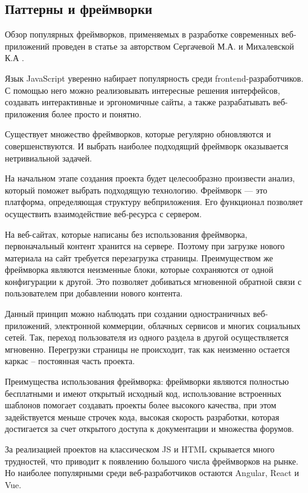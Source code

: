 \subsection{Паттерны и фреймворки}

Обзор популярных фреймворков, применяемых в разработке современных веб-приложений проведен в статье за авторством Сергачевой М.А. и Михалевской К.А \cite{sergacheva-framework}.

Язык JavaScript уверенно набирает популярность среди frontend-разработчиков.
С помощью него можно реализовывать интересные решения интерфейсов, создавать интерактивные и эргономичные сайты, а также разрабатывать веб-приложения более просто и понятно.

Существует множество фреймворков, которые регулярно обновляются и совершенствуются.
И выбрать наиболее подходящий фреймворк оказывается нетривиальной задачей.

На начальном этапе создания проекта будет целесообразно произвести анализ, который поможет
выбрать подходящую технологию.
Фреймворк — это платформа, определяющая структуру вебприложения.
Его функционал позволяет осуществить взаимодействие веб-ресурса с сервером.

На веб-сайтах, которые написаны без использования фреймворка, первоначальный контент хранится на сервере.
Поэтому при загрузке нового материала на сайт требуется перезагрузка страницы.
Преимуществом же фреймворка являются неизменные блоки, которые сохраняются от одной
конфигурации к другой.
Это позволяет добиваться мгновенной обратной связи с пользователем при добавлении нового контента.

Данный принцип можно наблюдать при создании одностраничных веб-приложений, электронной
коммерции, облачных сервисов и многих социальных сетей.
Так, переход пользователя из одного раздела в другой осуществляется мгновенно.
Перегрузки страницы не происходит, так как неизменно остается каркас – постоянная часть проекта.

Преимущества использования фреймворка: фреймворки являются полностью бесплатными и имеют открытый исходный код, использование встроенных шаблонов помогает создавать проекты более высокого качества, при этом задействуется меньше строчек кода, высокая скорость разработки, которая достигается за счет открытого доступа к документации и множества форумов.

За реализацией проектов на классическом JS и HTML скрывается много трудностей, что приводит к появлению большого числа фреймворков на рынке.
Но наиболее популярными среди веб-разработчиков остаются Angular, React и Vue.

